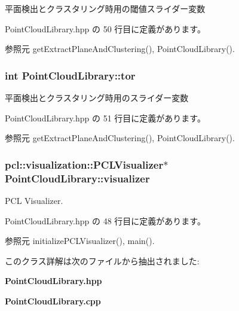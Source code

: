 平面検出とクラスタリング時用の閾値スライダー変数 



 Point\-Cloud\-Library.\-hpp の 50 行目に定義があります。



参照元 get\-Extract\-Plane\-And\-Clustering(), Point\-Cloud\-Library().

\subsubsection[{tor}]{\setlength{\rightskip}{0pt plus 5cm}int Point\-Cloud\-Library\-::tor}\label{class_point_cloud_library_ab5309a4bc712ded75c797a40e565d829}


平面検出とクラスタリング時用のスライダー変数 



 Point\-Cloud\-Library.\-hpp の 51 行目に定義があります。



参照元 get\-Extract\-Plane\-And\-Clustering(), Point\-Cloud\-Library().

\subsubsection[{visualizer}]{\setlength{\rightskip}{0pt plus 5cm}pcl\-::visualization\-::\-P\-C\-L\-Visualizer$\ast$ Point\-Cloud\-Library\-::visualizer}\label{class_point_cloud_library_a00af6b104220e288f26c2d6f890ccd86}


P\-C\-L Visualizer. 



 Point\-Cloud\-Library.\-hpp の 48 行目に定義があります。



参照元 initialize\-P\-C\-L\-Visualizer(), main().



このクラス詳解は次のファイルから抽出されました\-:\begin{DoxyCompactItemize}
\item 
{\bf Point\-Cloud\-Library.\-hpp}\item 
{\bf Point\-Cloud\-Library.\-cpp}\end{DoxyCompactItemize}
